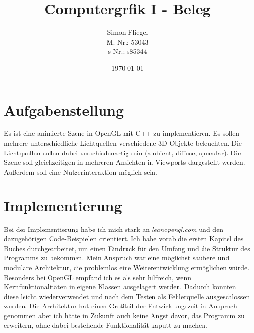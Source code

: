 \documentclass{article}
\let\oldsection\section
\renewcommand\section{\needspace{15\baselineskip}\oldsection}
\begin{document}
\title{Computergrfik I - Beleg}
\author{Simon Fliegel \\ M.-Nr.: 53043 \\ s-Nr.: s85344}
\date{\today}

\maketitle

\tableofcontents

\listoffigures

\clearpage

\section{Aufgabenstellung}
Es ist eine animierte Szene in OpenGL mit C++ zu implementieren.
Es sollen mehrere unterschiedliche Lichtquellen verschiedene 3D-Objekte beleuchten.
Die Lichtquellen sollen dabei verschiedenartig sein (ambient, diffuse, specular).
Die Szene soll gleichzeitigen in mehreren Ansichten in Viewports dargestellt werden.
Außerdem soll eine Nutzerinteraktion möglich sein.

\section{Implementierung}
Bei der Implementierung habe ich mich stark an \textit{leanopengl.com} \cite{learnopengl} und den dazugehörigen Code-Beispielen \cite{repository} orientiert.
Ich habe vorab die ersten Kapitel des Buches durchgearbeitet, um einen Eindruck für den Umfang und die Struktur des Programms zu bekommen.
Mein Anspruch war eine möglichst saubere und modulare Architektur, die problemlos eine Weiterentwicklung ermöglichen würde.
Besonders bei OpenGL empfand ich es als sehr hilfreich, wenn Kernfunktionalitäten in eigene Klassen ausgelagert werden.
Dadurch konnten diese leicht wiederverwendet und nach dem Testen als Fehlerquelle ausgeschlossen werden.
Die Architektur hat einen Großteil der Entwicklungszeit in Anspruch genommen aber ich hätte in Zukunft auch keine Angst davor, das Programm zu erweitern, ohne dabei bestehende Funktionalität kaputt zu machen.
\end{document}
